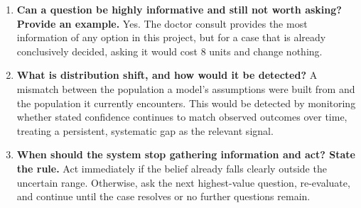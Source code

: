 \documentclass{article}
\begin{document}
\begin{enumerate}
{  information not worth obtaining?} How much better a decision-maker is
  for having asked, minus what asking cost. Information has no value,
  regardless of how much it teaches, if no possible answer could change
  the outcome, demonstrated concretely in Section 6.1.
\item
  \textbf{Can a question be highly informative and still not worth
  asking? Provide an example.} Yes. The doctor consult provides the most
  information of any option in this project, but for a case that is
  already conclusively decided, asking it would cost 8 units and change
  nothing.
\item
  \textbf{What is distribution shift, and how would it be detected?} A
  mismatch between the population a model's assumptions were built from
  and the population it currently encounters. This would be detected by
  monitoring whether stated confidence continues to match observed
  outcomes over time, treating a persistent, systematic gap as the
  relevant signal.
\item
  \textbf{When should the system stop gathering information and act?
  State the rule.} Act immediately if the belief already falls clearly
  outside the uncertain range. Otherwise, ask the next highest-value
  question, re-evaluate, and continue until the case resolves or no
  further questions remain.
\end{enumerate}
\end{document}

